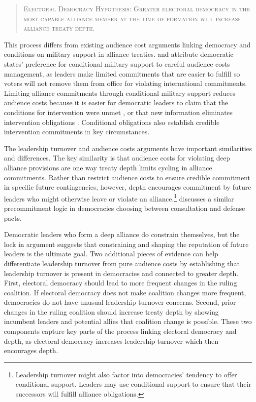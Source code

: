 \documentclass[12pt]{article}
\begin{document}
\begin{quote}
\textsc{Electoral Democracy Hypothesis: Greater electoral democracy in the most capable alliance member at the time of formation will increase alliance treaty depth.}
\end{quote}   


This process differs from existing audience cost arguments linking democracy and conditions on military support in alliance treaties. 
\citet{Mattes2012} and \citet{Chibaetal2015} attribute democratic states' preference for conditional military support to careful audience costs management, as leaders make limited commitments that are easier to fulfill so voters will not remove them from office for violating international commitments.
Limiting alliance commitments through conditional military support reduces audience costs because it is easier for democratic leaders to claim that the conditions for 
intervention were unmet \citep{FjelstulReiter2019}, or that new information eliminates intervention obligations \citep{LevenduskyHorowitz2012}. 
Conditional obligations also establish credible intervention commitments in key circumstances. 


The leadership turnover and audience costs arguments have important similarities and differences. 
The key similarity is that audience costs for violating deep alliance provisions are one way treaty depth limits cycling in alliance commitments. 
Rather than restrict audience costs to ensure credible commitment in specific future contingencies, however, depth encourages commitment by future leaders who might otherwise leave or violate an alliance.\footnote{Leadership turnover might also factor into democracies' tendency to offer conditional support. Leaders may use conditional support to ensure that their successors will fulfill alliance obligations.} 
\citet{Mattes2012a} discusses a similar precommitment logic in democracies choosing between consultation and defense pacts. 


Democratic leaders who form a deep alliance do constrain themselves, but the lock in argument suggests that constraining and shaping the reputation of future leaders is the ultimate goal. 
Two additional pieces of evidence can help differentiate leadership turnover from pure audience costs by establishing that leadership turnover is present in democracies and connected to greater depth. 
First, electoral democracy should lead to more frequent changes in the ruling coalition. 
If electoral democracy does not make coalition changes more frequent, democracies do not have unusual leadership turnover concerns.  
Second, prior changes in the ruling coalition should increase treaty depth by showing incumbent leaders and potential allies that coalition change is possible.  
These two components capture key parts of the process linking electoral democracy and depth, as electoral democracy increases leadership turnover which then encourages depth. 
\end{document}
